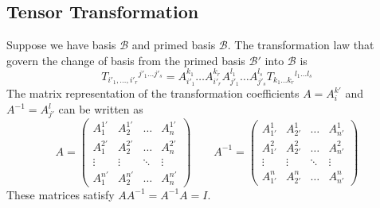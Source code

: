 \documentclass[../../../main.tex]{subfiles}
\begin{document}
\subsection{Tensor Transformation}
Suppose we have basis $\mathcal{B}$ and primed basis $\mathcal{B}$.
The transformation law that govern the change of basis from the primed basis $\mathcal{B}'$ into $\mathcal{B}$ is
\begin{equation*}
  T_{i'_{1}, \dots, i'_{r}}{}^{j'_{1} \dots j'_{s}}
  = A^{k_{1}}_{i'_{1}} \dots A^{k_{r}}_{i'_{r}} A^{l_{1}}_{j'_{1}} \dots A^{l_{s}}_{j'_{s}} T_{k_{1} \dots k_{r}}{}^{l_{1} \dots l_{s}}
\end{equation*}
The matrix representation of the transformation coefficients $A=A_{i}^{k'}$ and $A^{-1}=A_{j'}^{l}$ can be written as
\begin{equation*}
  A = \begin{pmatrix} A_{1}^{1'} & A_{2}^{1'} & \dots & A_{n}^{1'} \\ A_{1}^{2'} & A_{2}^{2'} & \dots & A_{n}^{2'} \\ \vdots & \vdots & \ddots & \vdots \\ A_{1}^{n'} & A_{2}^{n'} & \dots & A_{n}^{n'} \end{pmatrix}
  \qquad
  A^{-1} = \begin{pmatrix} A_{1'}^{1} & A_{2'}^{1} & \dots & A_{n'}^{1} \\ A_{1'}^{2} & A_{2'}^{2} & \dots & A_{n'}^{2} \\ \vdots & \vdots & \ddots & \vdots \\ A_{1'}^{n} & A_{2'}^{n} & \dots & A_{n'}^{n} \end{pmatrix}
\end{equation*}
These matrices satisfy $AA^{-1}=A^{-1}A=I$.
\end{document}
